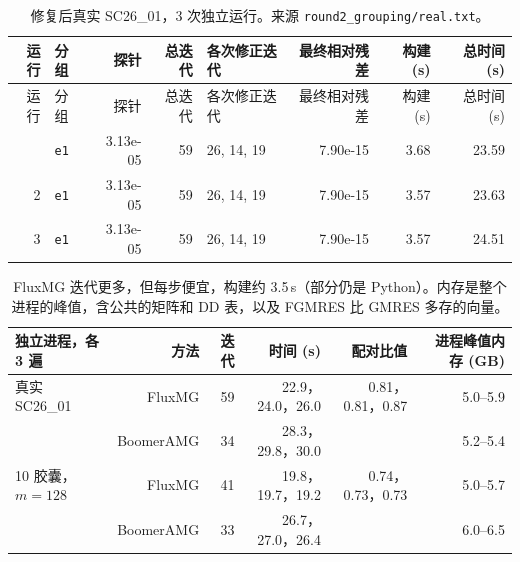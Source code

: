 {\footnotesize\setlength{\tabcolsep}{4pt}
\begin{longtable}{rlrrlrrr}
\caption{修复后真实 SC26\_01，3 次独立运行。来源 \texttt{round2\_grouping/real.txt}。}\\
\toprule
运行 & 分组 & 探针 & 总迭代 & 各次修正迭代 & 最终相对残差 & 构建 (s) & 总时间 (s) \\
\midrule
\endfirsthead
\toprule
运行 & 分组 & 探针 & 总迭代 & 各次修正迭代 & 最终相对残差 & 构建 (s) & 总时间 (s) \\
\midrule
\endhead
\bottomrule
\endlastfoot
1 & \texttt{e1\textbar 2\textbar 0} & 3.13e-05 & 59 & 26, 14, 19 & 7.90e-15 & 3.68 & 23.59 \\
2 & \texttt{e1\textbar 2\textbar 0} & 3.13e-05 & 59 & 26, 14, 19 & 7.90e-15 & 3.57 & 23.63 \\
3 & \texttt{e1\textbar 2\textbar 0} & 3.13e-05 & 59 & 26, 14, 19 & 7.90e-15 & 3.57 & 24.51 \\
\end{longtable}}
\begin{table}[H]
\centering\small
\begin{tabular}{lrrrrr}
\toprule
独立进程，各 3 遍 & 方法 & 迭代 & 时间 (s) & 配对比值 & 进程峰值内存 (GB) \\
\midrule
真实 SC26\_01 & FluxMG & 59 & 22.9，24.0，26.0 & 0.81，0.81，0.87 & 5.0--5.9 \\
 & BoomerAMG & 34 & 28.3，29.8，30.0 & & 5.2--5.4 \\
10 胶囊，$m=128$ & FluxMG & 41 & 19.8，19.7，19.2 & 0.74，0.73，0.73 & 5.0--5.7 \\
 & BoomerAMG & 33 & 26.7，27.0，26.4 & & 6.0--6.5 \\
\bottomrule
\end{tabular}
\caption{FluxMG 迭代更多，但每步便宜，构建约 3.5\,s（部分仍是 Python）。内存是整个进程的峰值，含公共的矩阵和 DD 表，以及 FGMRES 比 GMRES 多存的向量。}
\end{table}
